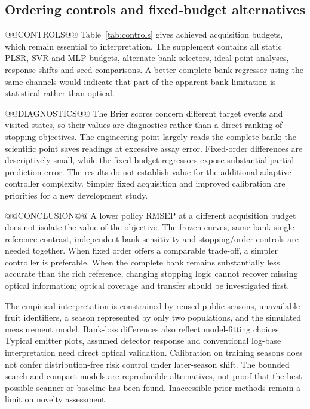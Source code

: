 \documentclass[11pt,a4paper]{article}
\begin{document}
\subsection{Ordering controls and fixed-budget alternatives}
@@CONTROLS@@ Table~\ref{tab:controls} gives achieved acquisition budgets, which remain essential to interpretation. The supplement contains all static PLSR, SVR and MLP budgets, alternate bank selectors, ideal-point analyses, response shifts and seed comparisons. A better complete-bank regressor using the same channels would indicate that part of the apparent bank limitation is statistical rather than optical.
\begin{table}[tb]\centering\small
\caption{Primary-bank controls and selected fixed-budget physical references, seed 42. Fixed-length scans use their development-selected length.}\label{tab:controls}

\end{table}

@@DIAGNOSTICS@@
The Brier scores concern different target events and visited states, so their values are diagnostics rather than a direct ranking of stopping objectives. The engineering point largely reads the complete bank; the scientific point saves readings at excessive assay error. Fixed-order differences are descriptively small, while the fixed-budget regressors expose substantial partial-prediction error. The results do not establish value for the additional adaptive-controller complexity. Simpler fixed acquisition and improved calibration are priorities for a new development study.

@@CONCLUSION@@ A lower policy RMSEP at a different acquisition budget does not isolate the value of the objective. The frozen curves, same-bank single-reference contrast, independent-bank sensitivity and stopping/order controls are needed together. When fixed order offers a comparable trade-off, a simpler controller is preferable. When the complete bank remains substantially less accurate than the rich reference, changing stopping logic cannot recover missing optical information; optical coverage and transfer should be investigated first.

The empirical interpretation is constrained by reused public seasons, unavailable fruit identifiers, a season represented by only two populations, and the simulated measurement model. Bank-loss differences also reflect model-fitting choices. Typical emitter plots, assumed detector response and conventional log-base interpretation need direct optical validation. Calibration on training seasons does not confer distribution-free risk control under later-season shift. The bounded search and compact models are reproducible alternatives, not proof that the best possible scanner or baseline has been found. Inaccessible prior methods remain a limit on novelty assessment.
\end{document}

